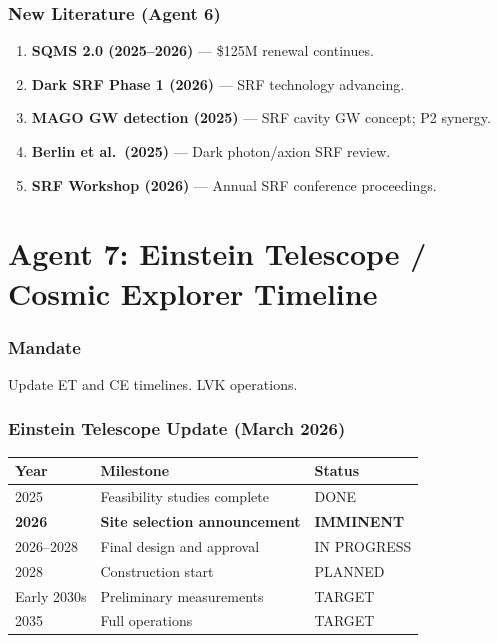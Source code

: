 \documentclass[11pt,a4paper]{article}
\begin{document}
\section{New Literature (Agent 6)}

\begin{enumerate}
\item \textbf{SQMS 2.0 (2025--2026)} --- \$125M renewal continues.
\item \textbf{Dark SRF Phase 1 (2026)} --- SRF technology advancing.
\item \textbf{MAGO GW detection (2025)} --- SRF cavity GW concept; P2 synergy.
\item \textbf{Berlin et al.\ (2025)} --- Dark photon/axion SRF review.
\item \textbf{SRF Workshop (2026)} --- Annual SRF conference proceedings.
\end{enumerate}


\part{Agent 7: Einstein Telescope / Cosmic Explorer Timeline}
\label{part:agent7}

\section{Mandate}

Update ET and CE timelines. LVK operations.

\section{Einstein Telescope Update (March 2026)}

\begin{center}
\begin{tabular}{lll}
\toprule
\textbf{Year} & \textbf{Milestone} & \textbf{Status} \\
\midrule
2025 & Feasibility studies complete & DONE \\
\textbf{2026} & \textbf{Site selection announcement} & \textbf{IMMINENT} \\
2026--2028 & Final design and approval & IN PROGRESS \\
2028 & Construction start & PLANNED \\
Early 2030s & Preliminary measurements & TARGET \\
2035 & Full operations & TARGET \\
\bottomrule
\end{tabular}
\end{center}
\end{document}
